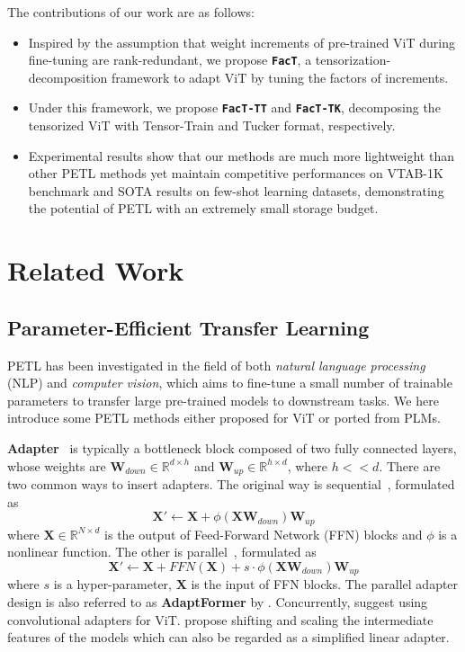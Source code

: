 The contributions of our work are as follows:

\begin{itemize}
    \item Inspired by the assumption that weight increments of pre-trained ViT during fine-tuning are rank-redundant, we propose \texttt{\textbf{FacT}}, a tensorization-decomposition framework to adapt ViT by tuning the factors of increments.
    \item Under this framework, we propose \texttt{\textbf{FacT-TT}} and \texttt{\textbf{FacT-TK}}, decomposing the tensorized ViT with Tensor-Train and Tucker format, respectively.
    \item Experimental results show that our methods are much more lightweight than other PETL methods yet maintain competitive performances on VTAB-1K benchmark and SOTA results on few-shot learning datasets, demonstrating the potential of PETL with an extremely small storage budget.

\end{itemize}

\section{Related Work}
\subsection{Parameter-Efficient Transfer Learning} PETL has been investigated in the field of both \emph{natural language processing} (NLP) and \emph{computer vision}, which aims to fine-tune a small number of trainable parameters to transfer large pre-trained models to downstream tasks. We here introduce some PETL methods either proposed for ViT or ported from PLMs. 

\textbf{Adapter}~\cite{adapter,compactor,adapter-cv} is typically a bottleneck block composed of two fully connected layers, whose weights are $\boldsymbol{W}_{down}\in \mathbb{R}^{d\times h}$ and $\boldsymbol{W}_{up}\in \mathbb{R}^{h\times d}$, where $h << d$. There are two common ways to insert adapters. The original way is sequential~\cite{adapter,adapterp}, formulated as
$$\boldsymbol{X}'\leftarrow\boldsymbol{X}+\phi(\boldsymbol{X}\boldsymbol{W}_{down})\boldsymbol{W}_{up}$$
where $\boldsymbol{X}\in \mathbb{R}^{N\times d}$ is the output of Feed-Forward Network (FFN) blocks and $\phi$ is a nonlinear function. The other is parallel~\cite{towards,adaptformer}, formulated as $$\boldsymbol{X}'\leftarrow\boldsymbol{X}+\textit{FFN}(\boldsymbol{X})+s\cdot\phi(\boldsymbol{X}\boldsymbol{W}_{down})\boldsymbol{W}_{up}$$
where $s$ is a hyper-parameter, $\boldsymbol{X}$ is the input of FFN blocks. The parallel adapter design is also referred to as \textbf{AdaptFormer} by \citet{adaptformer}. Concurrently, \citet{convpass} suggest using convolutional adapters for ViT. \citet{ssf} propose shifting and scaling the intermediate features of the models which can also be regarded as a simplified linear adapter.

